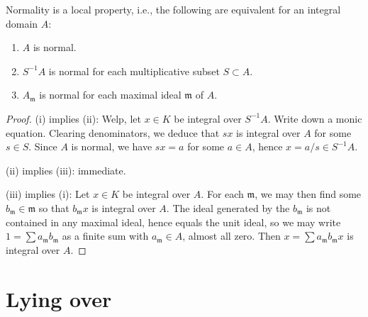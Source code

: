 \documentclass[reqno]{amsart}
\begin{document}
\begin{lemma}
  Normality is a local property,
  i.e., the following are equivalent
  for an integral domain $A$:
  \begin{enumerate}
  \item $A$ is normal.
  \item $S^{-1} A$ is normal for each multiplicative subset $S \subset A$.
  \item $A_\mathfrak{m}$ is normal for each maximal ideal $\mathfrak{m}$ of $A$.
  \end{enumerate}
\end{lemma}
\begin{proof}
  (i) implies (ii):
  Welp, let $x \in K$ be integral over $S^{-1} A$.
  Write down a monic equation.
  Clearing denominators, we deduce that $s x$ is integral over
  $A$ for some
  $s \in S$.
  Since $A$ is normal,
  we have $s x = a$ for some $a \in A$,
  hence $x = a/s \in S^{-1} A$.

  (ii) implies (iii): immediate.

  (iii) implies (i): Let $x \in K$ be integral over $A$.  For
  each $\mathfrak{m}$, we may then find some
  $b_\mathfrak{m} \in \mathfrak{m}$ so that $b_\mathfrak{m} x$
  is integral over $A$.  The ideal generated by the
  $b_\mathfrak{m}$ is not contained in any maximal ideal, hence
  equals the unit ideal, so we may write
  $1 = \sum a_\mathfrak{m} b_\mathfrak{m}$ as a finite sum with
  $a_\mathfrak{m} \in A$, almost all zero.  Then
  $x = \sum a_\mathfrak{m} b_\mathfrak{m} x$ is integral over
  $A$.
\end{proof}

\section{Lying over}
\label{sec:org5a401b5}
\end{document}
